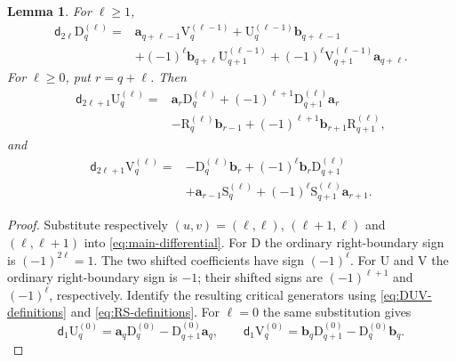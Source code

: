 \documentclass[a4paper,11pt,oneside,reqno]{amsart}
\newtheorem{lemma}[theorem]{Lemma}
\theoremstyle{definition}
\numberwithin{equation}{section}
\begin{document}
	\begin{lemma}\label{lem:DUV-boundaries}
		For $\ell\geq1$,
		\begin{equation}\label{eq:dD}
			\begin{aligned}
				\mathsf d_{2\ell}\mathrm{D}_q^{(\ell)}={}&
				\mathbf{a}_{q+\ell-1}\mathrm{V}_q^{(\ell-1)}
				+\mathrm{U}_q^{(\ell-1)}\mathbf{b}_{q+\ell-1}\\
				&+(-1)^\ell \mathbf{b}_{q+\ell}\mathrm{U}_{q+1}^{(\ell-1)}
				+(-1)^\ell \mathrm{V}_{q+1}^{(\ell-1)}\mathbf{a}_{q+\ell}.
			\end{aligned}
		\end{equation}
		For $\ell\geq0$, put $r=q+\ell$.  Then
		\begin{equation}\label{eq:dU}
			\begin{aligned}
				\mathsf d_{2\ell+1}\mathrm{U}_q^{(\ell)}={}&
				\mathbf{a}_r\mathrm{D}_q^{(\ell)}
				+(-1)^{\ell+1}\mathrm{D}_{q+1}^{(\ell)}\mathbf{a}_r\\
				&-\mathrm{R}_q^{(\ell)}\mathbf{b}_{r-1}
				+(-1)^{\ell+1}\mathbf{b}_{r+1}\mathrm{R}_{q+1}^{(\ell)},
			\end{aligned}
		\end{equation}
		and
		\begin{equation}\label{eq:dV}
			\begin{aligned}
				\mathsf d_{2\ell+1}\mathrm{V}_q^{(\ell)}={}&
				-\mathrm{D}_q^{(\ell)}\mathbf{b}_r+(-1)^\ell \mathbf{b}_r\mathrm{D}_{q+1}^{(\ell)}\\
				&+\mathbf{a}_{r-1}\mathrm{S}_q^{(\ell)}
				+(-1)^\ell \mathrm{S}_{q+1}^{(\ell)}\mathbf{a}_{r+1}.
			\end{aligned}
		\end{equation}
	\end{lemma}
	
	\begin{proof}
		Substitute respectively $(u,v)=(\ell,\ell)$, $(\ell+1,\ell)$ and
		$(\ell,\ell+1)$ into \eqref{eq:main-differential}.  For $\mathrm{D}$ the ordinary
		right-boundary sign is $(-1)^{2\ell}=1$.  The two shifted coefficients
		have sign $(-1)^\ell$.  For $\mathrm{U}$ and $\mathrm{V}$ the ordinary right-boundary
		sign is $-1$; their shifted signs are $(-1)^{\ell+1}$ and
		$(-1)^\ell$, respectively.  Identify the resulting critical generators
		using \eqref{eq:DUV-definitions} and \eqref{eq:RS-definitions}.
		For $\ell=0$ the same substitution gives
		\[
		\mathsf d_1\mathrm{U}_q^{(0)}=\mathbf{a}_q\mathrm{D}_q^{(0)}-\mathrm{D}_{q+1}^{(0)}\mathbf{a}_q,
		\qquad
		\mathsf d_1\mathrm{V}_q^{(0)}=\mathbf{b}_q\mathrm{D}_{q+1}^{(0)}-\mathrm{D}_q^{(0)}\mathbf{b}_q.
		\]
	\end{proof}
	
\end{document}
